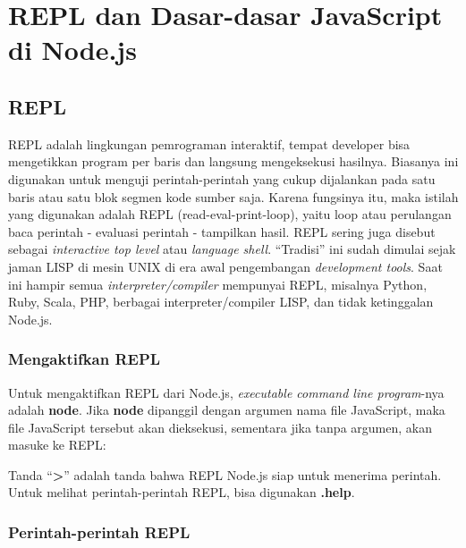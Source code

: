 \chapter{REPL dan Dasar-dasar JavaScript di Node.js}

\section{REPL}

REPL adalah lingkungan pemrograman interaktif, tempat developer bisa mengetikkan program per baris dan langsung mengeksekusi hasilnya. Biasanya ini digunakan untuk menguji perintah-perintah yang cukup dijalankan pada satu baris atau satu blok segmen kode sumber saja. Karena fungsinya itu, maka istilah yang digunakan adalah REPL (read-eval-print-loop), yaitu loop atau perulangan baca perintah - evaluasi perintah - tampilkan hasil. REPL sering juga disebut sebagai \textit{interactive top level} atau \textit{language shell}. ``Tradisi'' ini sudah dimulai sejak jaman LISP di mesin UNIX di era awal pengembangan \textit{development tools}. Saat ini hampir semua \textit{interpreter/compiler} mempunyai REPL, misalnya Python, Ruby, Scala, PHP, berbagai interpreter/compiler LISP, dan tidak ketinggalan Node.js. 

\subsection{Mengaktifkan REPL}

Untuk mengaktifkan REPL dari Node.js, \textit{executable command line program}-nya adalah \textbf{node}. Jika \textbf{node} dipanggil dengan argumen nama file JavaScript, maka file JavaScript tersebut akan dieksekusi, sementara jika tanpa argumen, akan masuke ke REPL:

\lstset{language=bash,caption=Node.js REPL}


Tanda ``\textbf{>}'' adalah tanda bahwa REPL Node.js siap untuk menerima perintah. Untuk melihat perintah-perintah REPL, bisa digunakan \textbf{.help}.

\subsection{Perintah-perintah REPL}

